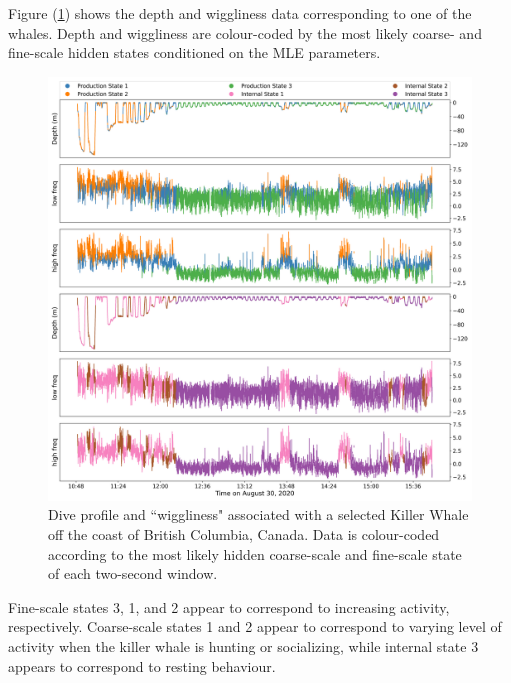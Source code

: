 Figure (\ref{fig:data}) shows the depth and wiggliness data corresponding to one of the whales. Depth and wiggliness are colour-coded by the most likely coarse- and fine-scale hidden states conditioned on the MLE parameters.
%
\begin{figure}
    \centering
    \includegraphics[width=6.5in]{plt/decoded_dives_kw_I145_K_3_3_nWhales_8.png}
    \caption{Dive profile and ``wiggliness" associated with a selected Killer Whale off the coast of British Columbia, Canada. Data is colour-coded according to the most likely hidden coarse-scale and fine-scale state of each two-second window.}
    \label{fig:data}
\end{figure}
%
Fine-scale states 3, 1, and 2 appear to correspond to increasing activity, respectively. Coarse-scale states 1 and 2 appear to correspond to varying level of activity when the killer whale is hunting or socializing, while internal state 3 appears to correspond to resting behaviour.

